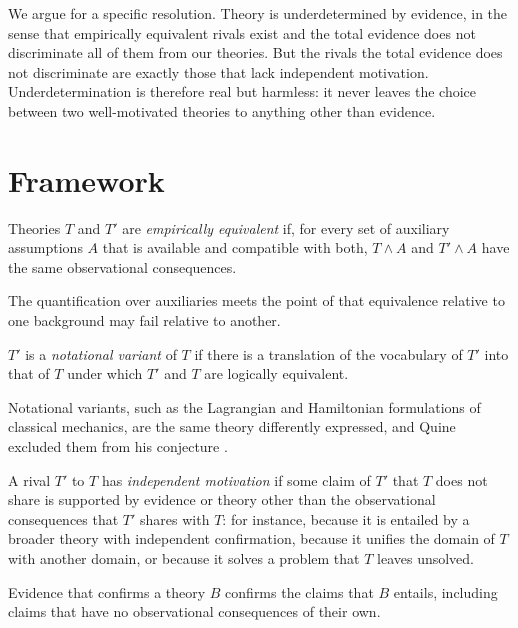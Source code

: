 \documentclass{situationist-preprint}
\begin{document}
We argue for a specific resolution. Theory is underdetermined by evidence, in the sense that empirically equivalent rivals exist and the total evidence does not discriminate all of them from our theories. But the rivals the total evidence does not discriminate are exactly those that lack independent motivation. Underdetermination is therefore real but harmless: it never leaves the choice between two well-motivated theories to anything other than evidence.

\section{Framework}

\begin{definition}\label{d:ee}
Theories $T$ and $T'$ are \emph{empirically equivalent} if, for every set of auxiliary assumptions $A$ that is available and compatible with both, $T \wedge A$ and $T' \wedge A$ have the same observational consequences.
\end{definition}

The quantification over auxiliaries meets the point of \citet{LaudanLeplin1991} that equivalence relative to one background may fail relative to another.

\begin{definition}\label{d:variant}
$T'$ is a \emph{notational variant} of $T$ if there is a translation of the vocabulary of $T'$ into that of $T$ under which $T'$ and $T$ are logically equivalent.
\end{definition}

Notational variants, such as the Lagrangian and Hamiltonian formulations of classical mechanics, are the same theory differently expressed, and Quine excluded them from his conjecture \citep{Quine1975}.

\begin{definition}\label{d:motiv}
A rival $T'$ to $T$ has \emph{independent motivation} if some claim of $T'$ that $T$ does not share is supported by evidence or theory other than the observational consequences that $T'$ shares with $T$: for instance, because it is entailed by a broader theory with independent confirmation, because it unifies the domain of $T$ with another domain, or because it solves a problem that $T$ leaves unsolved.
\end{definition}

\begin{principle}\label{p:indirect}
Evidence that confirms a theory $B$ confirms the claims that $B$ entails, including claims that have no observational consequences of their own.
\end{principle}
\end{document}
